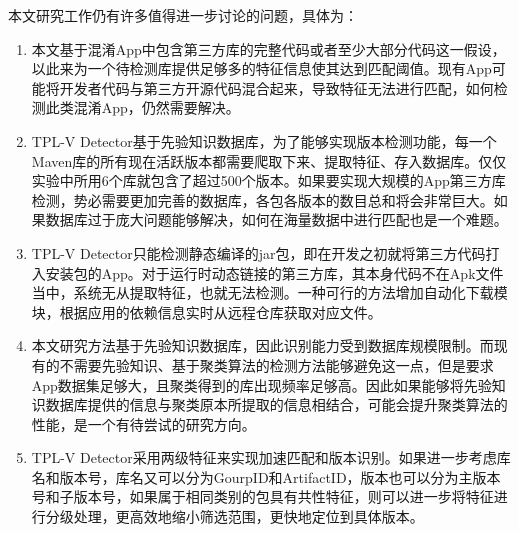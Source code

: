本文研究工作仍有许多值得进一步讨论的问题，具体为：
\begin{enumerate}
\item{本文基于混淆App中包含第三方库的完整代码或者至少大部分代码这一假设，以此来为一个待检测库提供足够多的特征信息使其达到匹配阈值。现有App可能将开发者代码与第三方开源代码混合起来，导致特征无法进行匹配，如何检测此类混淆App，仍然需要解决。}
\item{TPL-V Detector基于先验知识数据库，为了能够实现版本检测功能，每一个Maven库的所有现在活跃版本都需要爬取下来、提取特征、存入数据库。仅仅实验中所用6个库就包含了超过500个版本。如果要实现大规模的App第三方库检测，势必需要更加完善的数据库，各包各版本的数目总和将会非常巨大。如果数据库过于庞大问题能够解决，如何在海量数据中进行匹配也是一个难题。}
\item{TPL-V Detector只能检测静态编译的jar包，即在开发之初就将第三方代码打入安装包的App。对于运行时动态链接的第三方库，其本身代码不在Apk文件当中，系统无从提取特征，也就无法检测。一种可行的方法增加自动化下载模块，根据应用的依赖信息实时从远程仓库获取对应文件。}
\item{本文研究方法基于先验知识数据库，因此识别能力受到数据库规模限制。而现有的不需要先验知识、基于聚类算法的检测方法能够避免这一点，但是要求App数据集足够大，且聚类得到的库出现频率足够高。因此如果能够将先验知识数据库提供的信息与聚类原本所提取的信息相结合，可能会提升聚类算法的性能，是一个有待尝试的研究方向。}
\item{TPL-V Detector采用两级特征来实现加速匹配和版本识别。如果进一步考虑库名和版本号，库名又可以分为GourpID和ArtifactID，版本也可以分为主版本号和子版本号，如果属于相同类别的包具有共性特征，则可以进一步将特征进行分级处理，更高效地缩小筛选范围，更快地定位到具体版本。}
\end{enumerate}







